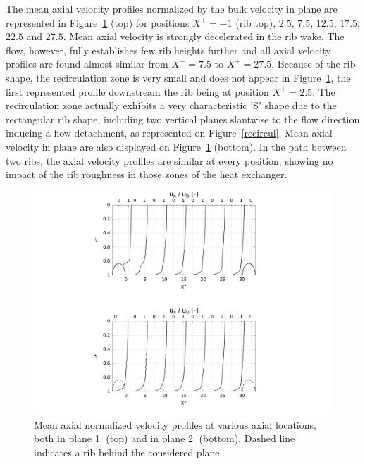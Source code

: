 The mean axial velocity profiles normalized by the bulk velocity in plane  are represented in Figure~\ref{Ux_mean} (top) for positions $X^+=-1$ (rib top), $2.5$, $7.5$, $12.5$, $17.5$, $22.5$ and $27.5$. Mean axial velocity is strongly decelerated in the rib wake. The flow, however, fully establishes few rib heights further and all axial velocity profiles are found almost similar from $X^+=7.5$ to $X^+=27.5$. Because of the rib shape, the recirculation zone is very small and does not appear in Figure~\ref{Ux_mean}, the first represented profile downstream the rib being at position $X^+=2.5$. The recirculation zone actually exhibits a very characteristic 'S' shape due to the rectangular rib shape, including two vertical planes slantwise to the flow direction inducing a flow detachment, as represented on Figure~\ref{recircul}. Mean axial velocity in plane  are also displayed on Figure~\ref{Ux_mean} (bottom). In the path between two ribs, the axial velocity profiles are similar at every position, showing no impact of the rib roughness in those zones of the heat exchanger.

\begin{figure}[!ht]
\centering
\includegraphics[width=0.7\linewidth,keepaspectratio]{fig/applications/optim/Axial_vel.pdf}
\caption{Mean axial normalized velocity profiles at various axial locations, both in plane \textcircled{1} (top) and in plane \textcircled{2} (bottom). Dashed line indicates a rib behind the considered plane.}
\label{Ux_mean}
\end{figure}

